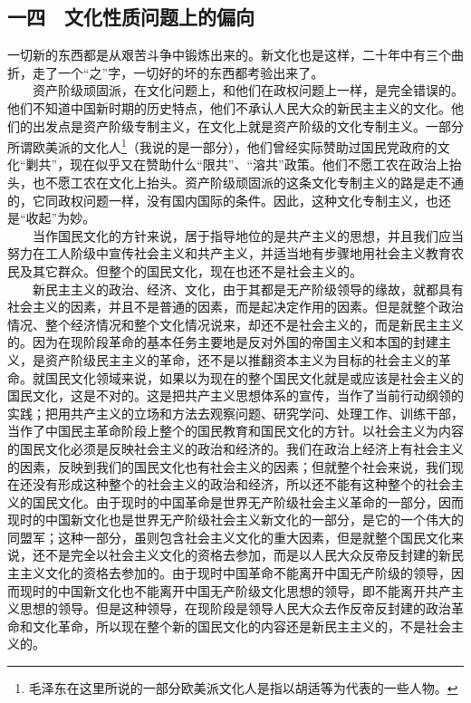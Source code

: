 \documentclass[cn,11pt,chinese]{elegantbook}
\def\myformat#1{\hfil\hfil #1}
\begin{document}
\subsection*{\myformat{一四　文化性质问题上的偏向}}
一切新的东西都是从艰苦斗争中锻炼出来的。新文化也是这样，二十年中有三个曲折，走了一个“之”字，一切好的坏的东西都考验出来了。\\
　　资产阶级顽固派，在文化问题上，和他们在政权问题上一样，是完全错误的。他们不知道中国新时期的历史特点，他们不承认人民大众的新民主主义的文化。他们的出发点是资产阶级专制主义，在文化上就是资产阶级的文化专制主义。一部分所谓欧美派的文化人\footnote[32]{ 毛泽东在这里所说的一部分欧美派文化人是指以胡适等为代表的一些人物。}（我说的是一部分），他们曾经实际赞助过国民党政府的文化“剿共”，现在似乎又在赞助什么“限共”、“溶共”政策。他们不愿工农在政治上抬头，也不愿工农在文化上抬头。资产阶级顽固派的这条文化专制主义的路是走不通的，它同政权问题一样，没有国内国际的条件。因此，这种文化专制主义，也还是“收起”为妙。\\
　　当作国民文化的方针来说，居于指导地位的是共产主义的思想，并且我们应当努力在工人阶级中宣传社会主义和共产主义，并适当地有步骤地用社会主义教育农民及其它群众。但整个的国民文化，现在也还不是社会主义的。\\
　　新民主主义的政治、经济、文化，由于其都是无产阶级领导的缘故，就都具有社会主义的因素，并且不是普通的因素，而是起决定作用的因素。但是就整个政治情况、整个经济情况和整个文化情况说来，却还不是社会主义的，而是新民主主义的。因为在现阶段革命的基本任务主要地是反对外国的帝国主义和本国的封建主义，是资产阶级民主主义的革命，还不是以推翻资本主义为目标的社会主义的革命。就国民文化领域来说，如果以为现在的整个国民文化就是或应该是社会主义的国民文化，这是不对的。这是把共产主义思想体系的宣传，当作了当前行动纲领的实践；把用共产主义的立场和方法去观察问题、研究学问、处理工作、训练干部，当作了中国民主革命阶段上整个的国民教育和国民文化的方针。以社会主义为内容的国民文化必须是反映社会主义的政治和经济的。我们在政治上经济上有社会主义的因素，反映到我们的国民文化也有社会主义的因素；但就整个社会来说，我们现在还没有形成这种整个的社会主义的政治和经济，所以还不能有这种整个的社会主义的国民文化。由于现时的中国革命是世界无产阶级社会主义革命的一部分，因而现时的中国新文化也是世界无产阶级社会主义新文化的一部分，是它的一个伟大的同盟军；这种一部分，虽则包含社会主义文化的重大因素，但是就整个国民文化来说，还不是完全以社会主义文化的资格去参加，而是以人民大众反帝反封建的新民主主义文化的资格去参加的。由于现时中国革命不能离开中国无产阶级的领导，因而现时的中国新文化也不能离开中国无产阶级文化思想的领导，即不能离开共产主义思想的领导。但是这种领导，在现阶段是领导人民大众去作反帝反封建的政治革命和文化革命，所以现在整个新的国民文化的内容还是新民主主义的，不是社会主义的。\\
\end{document}
